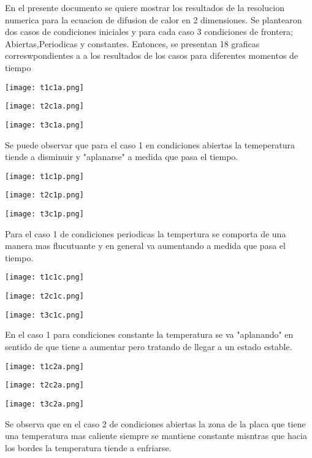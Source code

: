 \documentclass{article}
\begin{document}
En el presente documento se quiere mostrar los resultados de la resolucion numerica para la ecuacion de difusion de calor en 2 dimensiones. Se plantearon dos casos de condiciones iniciales y para cada caso 3 condiciones de frontera; Abiertas,Periodicas y constantes. Entonces, se presentan 18 graficas correswpondientes a a los resultados de los casos para diferentes momentos de tiempo \\


\begin{center}
\texttt{[image: t1c1a.png]}
\end{center}
\begin{center}
\texttt{[image: t2c1a.png]}
\end{center}
\begin{center}
\texttt{[image: t3c1a.png]}
\end{center}
Se puede observar que para el caso 1 en condiciones abiertas la temeperatura tiende a disminuir y "aplanarse" a medida que pasa el tiempo.
\\

\begin{center}
\texttt{[image: t1c1p.png]}
\end{center}
\begin{center}
\texttt{[image: t2c1p.png]}
\end{center}
\begin{center}
\texttt{[image: t3c1p.png]}
\end{center}
Para el caso 1 de condiciones periodicas la tempertura se comporta de una manera mas flucutuante y en general va aumentando a medida que pasa el tiempo.
\\

\begin{center}
\texttt{[image: t1c1c.png]}
\end{center}
\begin{center}
\texttt{[image: t2c1c.png]}
\end{center}
\begin{center}
\texttt{[image: t3c1c.png]}
\end{center}
En el caso 1 para condiciones constante la temperatura se va "aplanando" en sentido de que tiene a aumentar pero tratando de llegar a un estado estable.
\\


\begin{center}
\texttt{[image: t1c2a.png]}
\end{center}
\begin{center}
\texttt{[image: t2c2a.png]}
\end{center}
\begin{center}
\texttt{[image: t3c2a.png]}
\end{center}
Se observa que en el caso 2 de condiciones abiertas la zona de la placa que tiene una temperatura mas caliente siempre se mantiene constante misntras que hacia los bordes la temperatura tiende a enfriarse.
\\
\end{document}
